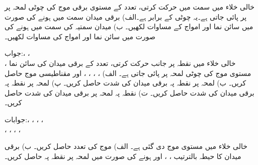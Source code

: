 
خالی خلاء میں  سمت میں حرکت کرتی،  تعدد  کے مستوی برقی موج  کی  چوٹی لمحہ  پر   پر پائی جاتی ہے۔یہ چوٹی  کے برابر ہے۔الف) برقی میدان  سمت میں ہونے کی صورت میں سائن نما   اور  امواج کے مساوات لکھیں۔ ب) میدان سمتیہ  کی سمت میں ہونے کی صورت
 میں سائن نما   اور   امواج کی مساوات لکھیں۔

جواب:، ،\\ ،  
خالی خلاء میں  نقطہ  پر  جانب حرکت کرتی،  تعدد کے برقی میدان کی سائن نما مستوی موج کی چوٹی لمحہ  پر  پائی جاتی ہے۔ الف) ، ، ، ،  اور مقناطیسی موج  حاصل کریں۔  ب) لمحہ  پر نقطہ  پہ برقی میدان کی شدت  حاصل کریں۔ پ) لمحہ  پر نقطہ  پہ برقی میدان کی شدت  حاصل کریں۔ ت) نقطہ  پہ لمحہ  پر برقی میدان کی شدت حاصل کریں۔ 

جوابات:، ، ، ، \\
،  ، ، ، 

خالی خلاء میں مستوی موج  دی گئی ہے۔ الف) موج کی تعدد  حاصل کریں۔ ب) برقی میدان کا حیطہ بالترتیب ، ،  اور  ہونے کی صورت میں لمحہ  پر نقطہ  پہ  حاصل کریں۔


